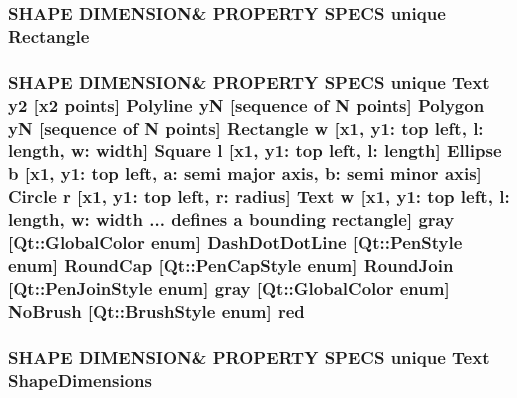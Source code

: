 \subsubsection[{\texorpdfstring{Rectangle}{Rectangle}}]{\setlength{\rightskip}{0pt plus 5cm}S\+H\+A\+PE D\+I\+M\+E\+N\+S\+I\+ON\& P\+R\+O\+P\+E\+R\+TY S\+P\+E\+CS unique {\bf Rectangle}}\hypertarget{shape__input__file__specs_8txt_abd9fcf84705ffbf8fa1f2c58d3938cb6}{}\label{shape__input__file__specs_8txt_abd9fcf84705ffbf8fa1f2c58d3938cb6}
\subsubsection[{\texorpdfstring{red}{red}}]{\setlength{\rightskip}{0pt plus 5cm}S\+H\+A\+PE D\+I\+M\+E\+N\+S\+I\+ON\& P\+R\+O\+P\+E\+R\+TY S\+P\+E\+CS unique {\bf Text} {\bf y2} \mbox{[}{\bf x2} points\mbox{]} {\bf Polyline} yN \mbox{[}sequence of N points\mbox{]} {\bf Polygon} yN \mbox{[}sequence of N points\mbox{]} {\bf Rectangle} w \mbox{[}{\bf x1}, y1\+: top left, l\+: length, w\+: width\mbox{]} {\bf Square} {\bf l} \mbox{[}{\bf x1}, y1\+: top left, l\+: length\mbox{]} {\bf Ellipse} b \mbox{[}{\bf x1}, y1\+: top left, a\+: semi major axis, b\+: semi minor axis\mbox{]} {\bf Circle} r \mbox{[}{\bf x1}, y1\+: top left, r\+: radius\mbox{]} {\bf Text} w \mbox{[}{\bf x1}, y1\+: top left, l\+: length, w\+: width ... defines {\bf a} bounding rectangle\mbox{]} gray \mbox{[}Qt\+::\+Global\+Color enum\mbox{]} Dash\+Dot\+Dot\+Line \mbox{[}Qt\+::\+Pen\+Style enum\mbox{]} Round\+Cap \mbox{[}{\bf Qt\+::\+Pen\+Cap\+Style} enum\mbox{]} Round\+Join \mbox{[}{\bf Qt\+::\+Pen\+Join\+Style} enum\mbox{]} gray \mbox{[}Qt\+::\+Global\+Color enum\mbox{]} No\+Brush \mbox{[}{\bf Qt\+::\+Brush\+Style} enum\mbox{]} red}\hypertarget{shape__input__file__specs_8txt_abb95a9d7d8170fbc37399adf2435c1d4}{}\label{shape__input__file__specs_8txt_abb95a9d7d8170fbc37399adf2435c1d4}
\subsubsection[{\texorpdfstring{Shape\+Dimensions}{ShapeDimensions}}]{\setlength{\rightskip}{0pt plus 5cm}S\+H\+A\+PE D\+I\+M\+E\+N\+S\+I\+ON\& P\+R\+O\+P\+E\+R\+TY S\+P\+E\+CS unique {\bf Text} Shape\+Dimensions}\hypertarget{shape__input__file__specs_8txt_a1bf25e58b08ba78abc93f104f4bc2914}{}\label{shape__input__file__specs_8txt_a1bf25e58b08ba78abc93f104f4bc2914}
